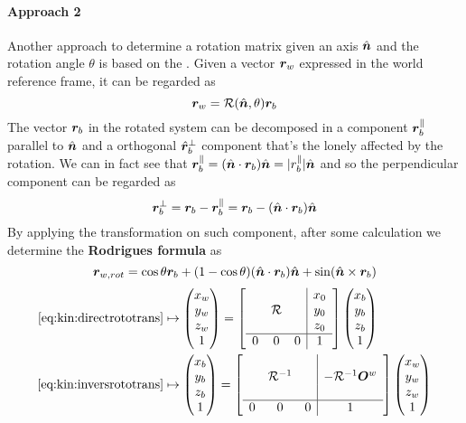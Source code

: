 		\paragraph{Approach 2} Another approach to determine a rotation matrix given an axis $\hat{\boldsymbol{n}}$ and the rotation angle $\theta$ is based on the . Given a vector $\boldsymbol{r}_w$ expressed in the world reference frame, it can be regarded as
		\begin{equation}
			\boldsymbol{r}_w = \mathcal R(\hat{\boldsymbol{n}},\theta) \boldsymbol{r}_b
		\end{equation}
		 The vector $\boldsymbol{r}_b$ in the rotated system can be decomposed in a component $\boldsymbol{r}_b^\parallel$ parallel to $\hat{\boldsymbol{n}}$ and a orthogonal $\hat{\boldsymbol{r}}_b^\perp$ component that's the lonely affected by the rotation. We can in fact see that $\boldsymbol{r}_b^\parallel = (\hat{\boldsymbol{n}}\cdot \boldsymbol{r}_b) \hat{\boldsymbol{n}} = |r_b^\parallel| \hat{\boldsymbol{n}}$ and so the perpendicular component can be regarded as
		 \[ \boldsymbol{r}_b^\perp = \boldsymbol{r}_b - \boldsymbol{r}_b^\parallel = \boldsymbol{r}_b - (\hat{\boldsymbol{n}} \cdot \boldsymbol{r}_b) \hat{\boldsymbol{n}} \]
		By applying the transformation on such component, after some calculation we determine the \textbf{Rodrigues formula} as
		\begin{equation}
			\boldsymbol{r}_{w,rot} = \cos \theta \boldsymbol{r}_b + (1-\cos\theta)(\hat{\boldsymbol{n}} \cdot \boldsymbol{r}_b) \hat{\boldsymbol{n}} + \sin(\hat{\boldsymbol{n}} \times \boldsymbol{r}_b)
		\end{equation}
		\begin{equation}
		\begin{aligned}
			\ref{eq:kin:directrototrans} & \mapsto \begin{pmatrix} x_w \\ y_w \\ z_w \\ 1 \end{pmatrix} = \begin{bmatrix}  \begin{array}{c c c | c}
					&&& x_0 \\
					&\mathcal R&& y_0 \\
					&&& z_0 \\ \hline
					0&0&0&1
			\end{array} \end{bmatrix} \begin{pmatrix} x_b \\ y_b \\ z_b \\ 1 \end{pmatrix} \\
			\ref{eq:kin:inversrototrans} & \mapsto \begin{pmatrix} x_b \\ y_b \\ z_b \\ 1 \end{pmatrix} = \begin{bmatrix}  \begin{array}{c c c | c}
					&&& \\
					&\mathcal R^{-1}&& -\mathcal R^{-1} \boldsymbol{O}^w \\
					&&& \\ \hline
					0&0&0&1
			\end{array} \end{bmatrix} \begin{pmatrix} x_w \\ y_w \\ z_w\\ 1 \end{pmatrix}
		\end{aligned}
	\end{equation}
		
		
		
		
		
		
		
		
		
		
		
		
		
		
		
		
		
		
		
		
		
	
	